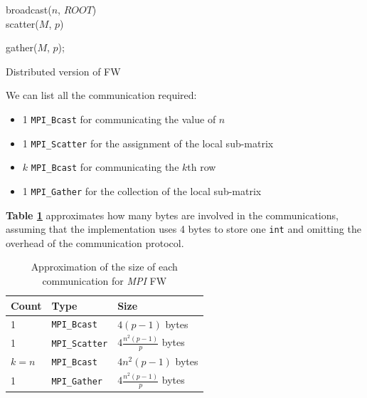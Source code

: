 \begin{algorithm}[h!]

\SetAlgoLined

broadcast($n$, $ROOT$) \\
scatter($M$, $p$)

gather($M$, $p$);
 
\caption{Distributed version of FW}\label{alg:mpi}
\end{algorithm}


We can list all the communication required:
\begin{itemize}
\item{1 \texttt{MPI\_Bcast} for communicating the value of $n$}
\item{1 \texttt{MPI\_Scatter} for the assignment of the local sub-matrix}
\item{$k$ \texttt{MPI\_Bcast} for communicating the $k$th row}
\item{1 \texttt{MPI\_Gather} for the collection of the local sub-matrix}
\end{itemize}

\textbf{Table \ref*{tab:comm}} approximates how many bytes are involved in the communications, assuming that
the implementation uses 4 bytes to store one \texttt{int} and omitting the overhead of the communication protocol.
\begin{table}[h!]
\centering
\begin{tabular}{|l|l|l|}
\hline
\rowcolor[HTML]{F56B00} 
{\color[HTML]{FFFFFF} \textbf{Count}} & {\color[HTML]{FFFFFF} \textbf{Type}} & {\color[HTML]{FFFFFF} \textbf{Size}} \\ \hline
1                                     &  \texttt{MPI\_Bcast}                 &  $4(p-1)$ bytes                      \\ \hline
1                                     &  \texttt{MPI\_Scatter}               &  $4\frac{n^2(p-1)}{p}$ bytes         \\ \hline
$k = n$                               &  \texttt{MPI\_Bcast}                 &  $4n^2(p-1)$ bytes                    \\ \hline
1                                     &  \texttt{MPI\_Gather}                &  $4\frac{n^2(p-1)}{p}$ bytes         \\ \hline
\end{tabular}
\caption{Approximation of the size of each communication for \emph{MPI} FW}                                                                                                                                            
\label{tab:comm}
\end{table}
\par

